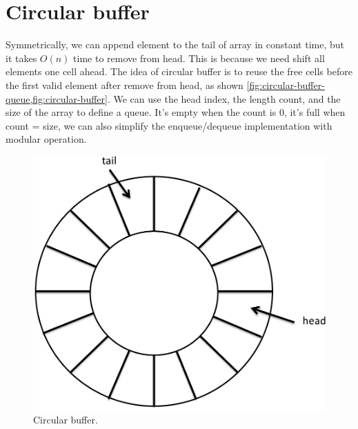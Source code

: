 \documentclass[b5paper]{article}
\begin{document}
\section{Circular buffer}

Symmetrically, we can append element to the tail of array in constant time, but it takes $O(n)$ time to remove from head. This is because we need shift all elements one cell ahead. The idea of circular buffer is to reuse the free cells before the first valid element after remove from head, as shown \cref{fig:circular-buffer-queue,fig:circular-buffer}. We can use the head index, the length count, and the size of the array to define a queue. It's empty when the count is 0, it's full when count = size, we can also simplify the enqueue/dequeue implementation with modular operation.

\begin{figure}[htbp]
 \centering
 \includegraphics[scale=0.3]{img/ring-buffer}
 \caption{Circular buffer.}
 \label{fig:circular-buffer}
\end{figure}
\end{document}
